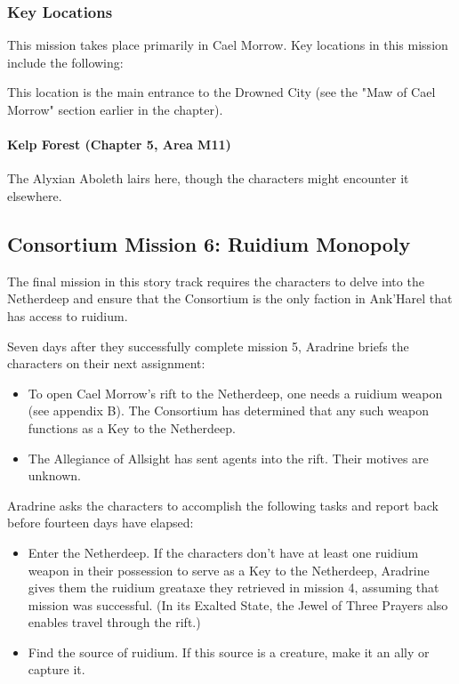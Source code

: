\documentclass[10pt,a4paper,twoside,twocolumn,openany,nodeprecatedcode]{dndbook}
\begin{document}
\subsubsection{Key Locations}
This mission takes place primarily in Cael Morrow. Key locations in this mission include the following:


\begin{description}[nolistsep]
\item[Maw of Cael Morrow.]
This location is the main entrance to the Drowned City (see the "Maw of Cael Morrow" section earlier in the chapter).
\end{description}

\paragraph{Kelp Forest (Chapter 5, Area M11)}
The Alyxian Aboleth lairs here, though the characters might encounter it elsewhere.

\subsection{Consortium Mission 6: Ruidium Monopoly}
The final mission in this story track requires the characters to delve into the Netherdeep and ensure that the Consortium is the only faction in Ank'Harel that has access to ruidium.

Seven days after they successfully complete mission 5, Aradrine briefs the characters on their next assignment:


\begin{itemize}
\item To open Cael Morrow's rift to the Netherdeep, one needs a ruidium weapon (see appendix B). The Consortium has determined that any such weapon functions as a Key to the Netherdeep.
\item The Allegiance of Allsight has sent agents into the rift. Their motives are unknown.
\end{itemize}

Aradrine asks the characters to accomplish the following tasks and report back before fourteen days have elapsed:


\begin{itemize}
\item Enter the Netherdeep. If the characters don't have at least one ruidium weapon in their possession to serve as a Key to the Netherdeep, Aradrine gives them the ruidium greataxe they retrieved in mission 4, assuming that mission was successful. (In its Exalted State, the Jewel of Three Prayers also enables travel through the rift.)
\item Find the source of ruidium. If this source is a creature, make it an ally or capture it.
\end{itemize}
\end{document}
